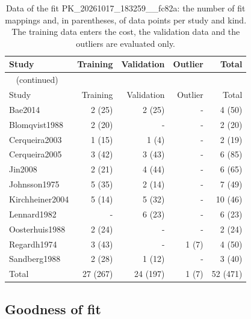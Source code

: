 \documentclass{article}
\begin{document}
\begin{longtable}{lrrrr}
\caption{Data of the fit PK\_20261017\_183259\_\_fc82a: the number of fit mappings and, in parentheses, of data points per study and kind. The training data enters the cost, the validation data and the outliers are evaluated only.}\label{tab:data:PK_20261017_183259__fc82a} \\
\toprule
Study & Training & Validation & Outlier & Total \\
\midrule
\endfirsthead
\multicolumn{5}{l}{\small\tablename~\thetable{} (continued)} \\
\toprule
Study & Training & Validation & Outlier & Total \\
\midrule
\endhead
\bottomrule
\endlastfoot
Bae2014 & 2 (25) & 2 (25) & - & 4 (50) \\
Blomqvist1988 & 2 (20) & - & - & 2 (20) \\
Cerqueira2003 & 1 (15) & 1 (4) & - & 2 (19) \\
Cerqueira2005 & 3 (42) & 3 (43) & - & 6 (85) \\
Jin2008 & 2 (21) & 4 (44) & - & 6 (65) \\
Johnsson1975 & 5 (35) & 2 (14) & - & 7 (49) \\
Kirchheiner2004 & 5 (14) & 5 (32) & - & 10 (46) \\
Lennard1982 & - & 6 (23) & - & 6 (23) \\
Oosterhuis1988 & 2 (24) & - & - & 2 (24) \\
Regardh1974 & 3 (43) & - & 1 (7) & 4 (50) \\
Sandberg1988 & 2 (28) & 1 (12) & - & 3 (40) \\
Total & 27 (267) & 24 (197) & 1 (7) & 52 (471) \\
\end{longtable}

\subsection{Goodness of fit}
\end{document}
